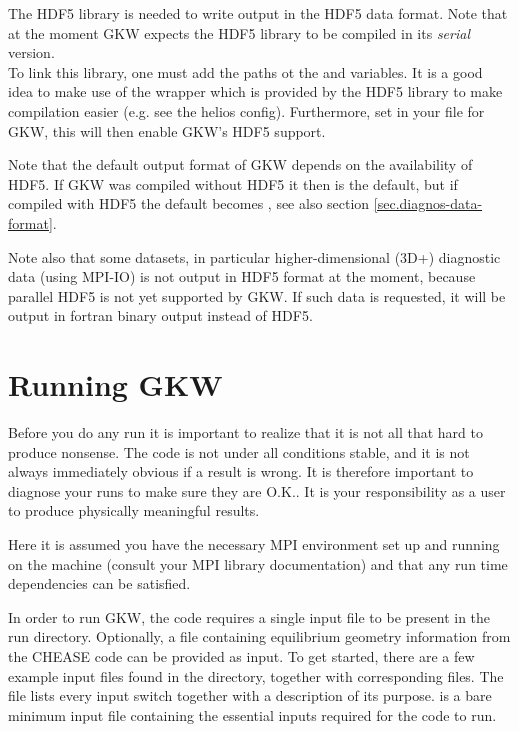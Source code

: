 The HDF5 library is needed to write output in the HDF5 data format.
Note that at the moment GKW expects the HDF5 library to be compiled in
its \emph{serial} version.\\
To link this library, one must add the paths ot the  and
 variables. It is a good idea to make use of the
 wrapper which is provided by the HDF5 library to make
compilation easier (e.g. see the helios config).  Furthermore,
set  in your  file for GKW, this
will then enable GKW's HDF5 support.

Note that the default output format of GKW depends on the availability
of HDF5. If GKW was compiled without HDF5 it then  is the default, but if
compiled with HDF5 the default becomes ,
see also section \ref{sec.diagnos-data-format}.

Note also that some datasets, in particular higher-dimensional (3D+)
diagnostic data (using MPI-IO) is not output in HDF5 format at the
moment, because parallel HDF5 is not yet supported by GKW.  If such
data is requested, it will be output in fortran binary output instead of HDF5.


\section{Running GKW}

Before you do any run it is important to realize that it is not all that hard to produce nonsense. 
The code is not under all conditions stable, and it is not always immediately obvious if a 
result is wrong. It is therefore important to diagnose your runs to make sure they are O.K.. 
It is your responsibility as a user to produce physically meaningful results.

Here it is assumed you have the necessary MPI environment set up and
running on the machine (consult your MPI library documentation) and that any run time
dependencies can be satisfied.

In order to run GKW, the code requires a single input file  to be present
in the run directory. Optionally, a file containing equilibrium geometry information from
the CHEASE code can be provided as input.
To get started, there are a few example input files found in the  directory,
together with corresponding  files. The file  lists every input switch
together with a description of its purpose.  is a bare minimum input file containing
the essential inputs required for the code to run.

